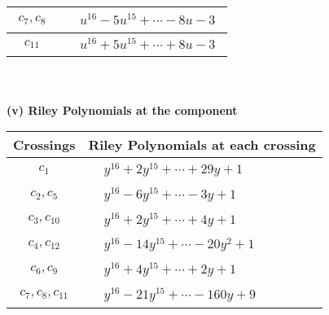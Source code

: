\documentclass[1p]{elsarticle_modified}
\theoremstyle{definition}
\begin{document}
\begin{tabular}{m{50pt}|m{274pt}}
\hline $$\begin{aligned}c_{7},c_{8}\end{aligned}$$&$\begin{aligned}
&u^{16}-5 u^{15}+\cdots-8 u-3
\end{aligned}$\\
\hline $$\begin{aligned}c_{11}\end{aligned}$$&$\begin{aligned}
&u^{16}+5 u^{15}+\cdots+8 u-3
\end{aligned}$\\
\hline
\end{tabular}\\~\\
\newpage\renewcommand{\arraystretch}{1}
\flushleft \textbf{(v) Riley Polynomials at the component}\newline \\
\begin{tabular}{m{50pt}|m{274pt}}
Crossings & \hspace{64pt}Riley Polynomials at each crossing \\
\hline $$\begin{aligned}c_{1}\end{aligned}$$&$\begin{aligned}
&y^{16}+2 y^{15}+\cdots+29 y+1
\end{aligned}$\\
\hline $$\begin{aligned}c_{2},c_{5}\end{aligned}$$&$\begin{aligned}
&y^{16}-6 y^{15}+\cdots-3 y+1
\end{aligned}$\\
\hline $$\begin{aligned}c_{3},c_{10}\end{aligned}$$&$\begin{aligned}
&y^{16}+2 y^{15}+\cdots+4 y+1
\end{aligned}$\\
\hline $$\begin{aligned}c_{4},c_{12}\end{aligned}$$&$\begin{aligned}
&y^{16}-14 y^{15}+\cdots-20 y^2+1
\end{aligned}$\\
\hline $$\begin{aligned}c_{6},c_{9}\end{aligned}$$&$\begin{aligned}
&y^{16}+4 y^{15}+\cdots+2 y+1
\end{aligned}$\\
\hline $$\begin{aligned}c_{7},c_{8},c_{11}\end{aligned}$$&$\begin{aligned}
&y^{16}-21 y^{15}+\cdots-160 y+9
\end{aligned}$\\
\hline
\end{tabular}\\~\\
\end{document}
